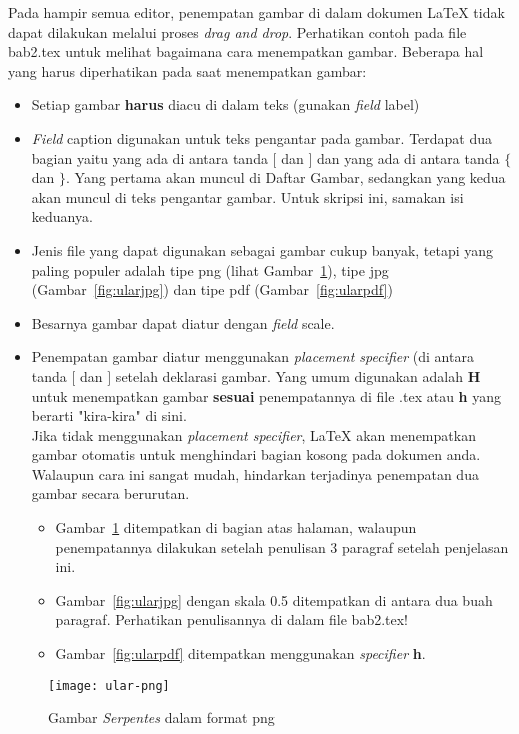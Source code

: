 Pada hampir semua editor, penempatan gambar di dalam dokumen \LaTeX{} tidak dapat dilakukan melalui proses {\it drag and drop}.
Perhatikan contoh pada file bab2.tex untuk melihat bagaimana cara menempatkan gambar.
Beberapa hal yang harus diperhatikan pada saat menempatkan gambar:
\begin{itemize}
	\item Setiap gambar {\bf harus} diacu di dalam teks (gunakan {\it field} {\sc label})
	\item {\it Field} {\sc caption} digunakan untuk teks pengantar pada gambar. Terdapat dua bagian yaitu yang ada di antara tanda $[$ dan $]$ dan yang ada di antara tanda $\{$ dan $\}$. Yang pertama akan muncul di Daftar Gambar, sedangkan yang kedua akan muncul di teks pengantar gambar. Untuk skripsi ini, samakan isi keduanya.
	\item Jenis file yang dapat digunakan sebagai gambar cukup banyak, tetapi yang paling populer adalah tipe {\sc png} (lihat Gambar~\ref{fig:ularpng}), tipe {\sc jpg} (Gambar~\ref{fig:ularjpg}) dan tipe {\sc pdf} (Gambar~\ref{fig:ularpdf})
	\item Besarnya gambar dapat diatur dengan {\it field} {\sc scale}.
	\item Penempatan gambar diatur menggunakan {\it placement specifier} (di antara tanda  $[$ dan $]$ setelah deklarasi gambar.
	Yang umum digunakan adalah {\bf H} untuk menempatkan gambar {\bf sesuai} penempatannya di file .tex atau  {\bf h} yang berarti "kira-kira" di sini. \\
	Jika tidak menggunakan {\it placement specifier}, \LaTeX{} akan menempatkan gambar otomatis untuk menghindari bagian kosong pada dokumen anda.
	Walaupun cara ini sangat mudah, hindarkan terjadinya penempatan dua gambar secara berurutan. 	
	\begin{itemize}
		\item Gambar~\ref{fig:ularpng} ditempatkan di bagian atas halaman, walaupun penempatannya dilakukan setelah penulisan 3 paragraf setelah penjelasan ini.
		\item Gambar~\ref{fig:ularjpg} dengan skala 0.5 ditempatkan di antara dua buah paragraf. Perhatikan penulisannya di dalam file bab2.tex!
		\item Gambar~\ref{fig:ularpdf} ditempatkan menggunakan {\it specifier} {\bf h}.
	\end{itemize}
\end{itemize}
 
\begin{figure} 
	\centering  
	\texttt{[image: ular-png]}  
	\caption[Gambar {\it Serpentes} dalam format png]{Gambar {\it Serpentes} dalam format png} 
	\label{fig:ularpng} 
\end{figure} 

